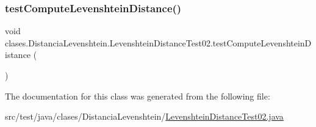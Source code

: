 \subsubsection{\texorpdfstring{test\+Compute\+Levenshtein\+Distance()}{testComputeLevenshteinDistance()}}
{\footnotesize\ttfamily void clases.\+Distancia\+Levenshtein.\+Levenshtein\+Distance\+Test02.\+test\+Compute\+Levenshtein\+Distance (\begin{DoxyParamCaption}{ }\end{DoxyParamCaption})}



The documentation for this class was generated from the following file\+:\begin{DoxyCompactItemize}
\item 
src/test/java/clases/\+Distancia\+Levenshtein/\hyperlink{_levenshtein_distance_test02_8java}{Levenshtein\+Distance\+Test02.\+java}\end{DoxyCompactItemize}

